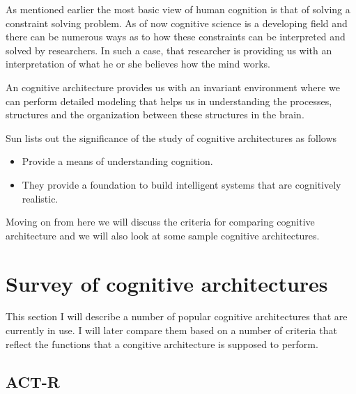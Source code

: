 As mentioned earlier the most basic view of human cognition is that of
solving a constraint solving problem\cite{Newell:1990aa}. As of now
cognitive science is a developing field and there can be numerous ways
as to how these constraints can be interpreted and solved by
researchers. In such a case, that researcher is providing us with an
interpretation of what he or she believes how the mind works.

An cognitive architecture provides us with an invariant environment
where we can perform detailed modeling that helps us in understanding
the processes, structures and the organization between these
structures in the brain\cite{journals/jetai/Sun07}.
 

Sun\cite{journals/jetai/Sun07} lists out the significance of the study
of cognitive architectures as follows
\begin{itemize}
\item Provide a means of understanding cognition.
\item They provide a foundation to build intelligent systems that are
  cognitively realistic.
\end{itemize}

Moving on from here we will discuss the criteria for comparing
cognitive architecture and we will also look at some sample cognitive
architectures.

\section{Survey of cognitive architectures}

This section I will describe a number of popular cognitive
architectures that are currently in use. I will later compare them
based on a number of criteria that reflect the functions that a
congitive architecture is supposed to perform.


\subsection{ACT-R}

